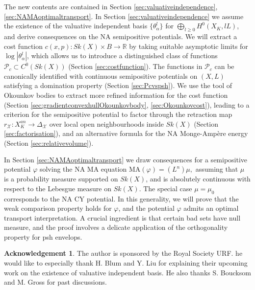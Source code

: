 \documentclass[a4paper]{article}
\theoremstyle{definition}
\newtheorem*{Acknowledgement}{Acknowledgement}
\newcommand{\R}{\mathbb{R}}
\begin{document}
	
	
	The new contents are contained in Section \ref{sec:valuativeindependence}, \ref{sec:NAMAoptimaltransport}.
	In Section \ref{sec:valuativeindependence} we assume the existence of the valuative independent basis  $\{ \theta_\alpha^l \}$ for $\bigoplus_{l\geq 0} H^0(X_K, lL)$, and derive consequences on the NA semipositive potentials. We will extract a cost function $c(x,p): Sk(X)\times B\to \R$ by taking suitable asymptotic limits for $\log |\theta_\alpha^l|$, which allows us to introduce a distinguished class of functions $\mathcal{P}_c\subset C^0(Sk(X))$ (Section \ref{sec:costfunction}). The functions in $\mathcal{P}_c$ can be canonically identified with continuous semipositive potentials on $(X,L)$ satisfying a domination property (Section \ref{sec:Pcvspsh}). We use the tool of Okounkov bodies to extract more refined information for the cost function (Section \ref{sec:gradientconvexhullOkounkovbody}, \ref{sec:Okounkovcost}), leading to a criterion for the semipositive potential to factor through the retraction map $r_\mathcal{X}: X_K^{an}\to \Delta_\mathcal{X}$ over local open neighbourhoods inside $Sk(X)$ (Section \ref{sec:factorisation}), and an alternative formula for the NA Monge-Amp\`ere energy (Section \ref{sec:relativevolume}). 
	
	
	
	
	
	In Section \ref{sec:NAMAoptimaltransport} we draw consequences  for a semipositive potential $\varphi$ solving the NA MA equation
$
	\text{MA}(\varphi)= (L^n) \mu,
$
	assuming that $\mu$ is a probability measure supported on $Sk(X)$, and is absolutely continuous with respect to the Lebesgue measure on $Sk(X)$.  The special case  $\mu=\mu_0$ corresponds to the NA CY potential. In this generality, we will prove that the weak comparison property holds for $\varphi$, and the potential $\varphi$ admits an optimal transport interpretation. A crucial ingredient is that certain bad sets have null measure, and the proof involves a delicate application of the orthogonality property for psh envelops.
	
	
	
	\begin{Acknowledgement}
	The author is sponsored by the Royal Society URF. he would like to especially thank H. Blum and Y. Liu for explaining their upcoming work on the existence of valuative independent basis. He also thanks S. Boucksom and M. Gross for past discussions.
	\end{Acknowledgement}
	
\end{document}
